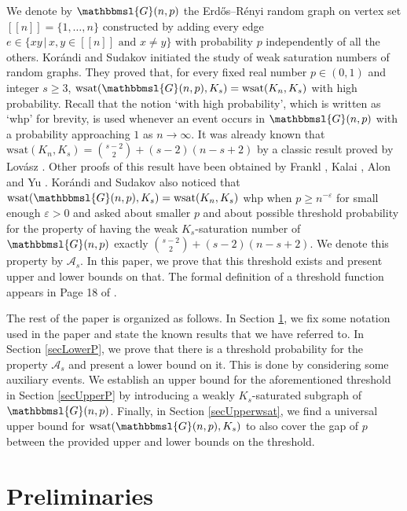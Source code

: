\documentclass[hidelinks, 11pt]{article}
\theoremstyle{plain}
\theoremstyle{definition}
\begin{document}
We denote by $\mathbbmsl{G}(n,p)$  the Erd\H{o}s--R\'{e}nyi  random graph on vertex set $[\![n]\!]=\{1,\ldots,n\}$ constructed by adding every edge $e\in\{xy \, | \, x, y\in [\![n]\!] \text{ and }  x\neq y\}$
with probability    $p$  independently of all the others. Kor\'{a}ndi and   Sudakov    \cite{kor}  initiated  the study of  weak saturation numbers of random graphs. They   proved that, for every fixed real number  $p\in(0, 1)$ and integer  $s\geq 3$, $\mathrm{wsat}(\mathbbmsl{G}(n, p), K_s)=\mathrm{wsat}(K_n, K_s)$ with high probability. Recall that the  notion `with high probability', which is written as  `whp' for brevity,   is used whenever   an event  occurs in     $\mathbbmsl{G}(n,p)$  with a  probability approaching $1$ as $n\to\infty$. It was already known that    $\mathrm{wsat}(K_n, K_s)={s-2 \choose 2}+(s-2)(n-s+2)$ by a classic result proved by Lov\'{a}sz \cite{L77}.
Other proofs of this result have been obtained by Frankl \cite{Frankl82}, Kalai \cite{Kalai84, Kalai85}, Alon \cite{Alon85}  and Yu \cite{Yu93}.
Kor\'{a}ndi and Sudakov    \cite{kor} also     noticed that  $\mathrm{wsat}(\mathbbmsl{G}(n, p), K_s)=\mathrm{wsat}(K_n, K_s)$ whp when $p\geq n^{-\varepsilon}$ for small
enough $\varepsilon> 0$ and asked about smaller $p$ and about possible  threshold probability for the
property of having the weak $K_s$-saturation number of $\mathbbmsl{G}(n,p)$  exactly ${s-2 \choose 2}+(s-2)(n-s+2)$.    We denote this property   by $\mathcal{A}_s$.
In this paper, we prove that this threshold exists and present  upper and lower  bounds on that. The formal   definition of  a    threshold function      appears  in Page 18 of    \cite{RG}.


The rest of the paper is organized as follows. In Section \ref{prelim}, we fix some  notation     used in the paper and state  the known results   that we have referred to. In Section \ref{secLowerP},  we prove that there is a threshold probability  for the property   $\mathcal{A}_s$ and present a lower
bound on it. This is done by considering  some  auxiliary events. We establish an upper bound for the aforementioned threshold in Section \ref{secUpperP} by introducing a weakly $K_s$-saturated subgraph of $\mathbbmsl{G}(n,p)$. Finally, in Section \ref{secUpperwsat}, we find a universal upper bound for $\mathrm{wsat}(\mathbbmsl{G}(n, p), K_s)$ to also cover the gap of $p$ between the provided upper and lower bounds on the threshold.



\section{Preliminaries}\label{prelim}
\end{document}
